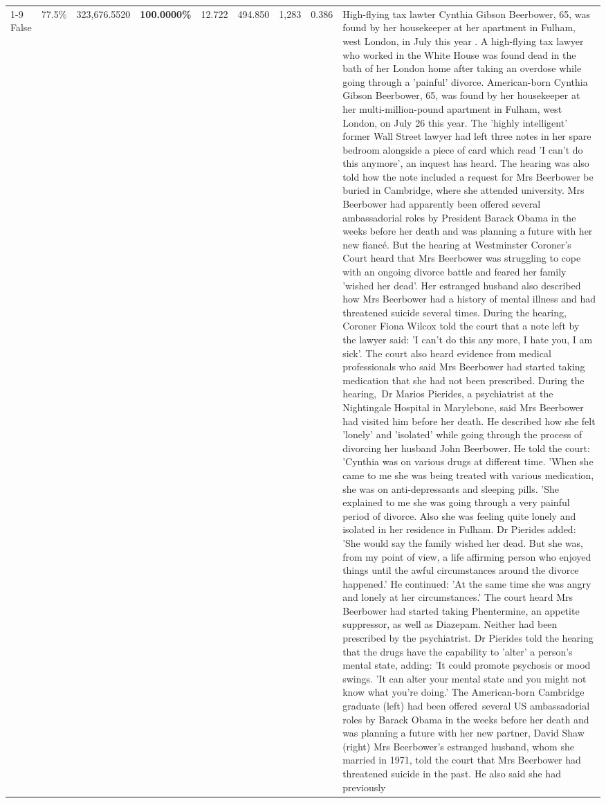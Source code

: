 \begin{table}[H]
\begin{tabular}{lllrlllll}
\cline{1-9}
False & 77.5\% & 323,676.5520 & \bfseries \color{red} 100.0000\% & 12.722 & 494.850 & 1,283 & 0.386 & High-flying tax lawter Cynthia Gibson Beerbower, 65, was found by her housekeeper at her apartment in Fulham, west London, in July this year . A high-flying tax lawyer who worked in the White House was found dead in the bath of her London home after taking an overdose while going through a 'painful' divorce. American-born Cynthia Gibson Beerbower, 65, was found by her housekeeper at her multi-million-pound apartment in Fulham, west London, on July 26 this year. The 'highly intelligent' former Wall Street lawyer had left three notes in her spare bedroom alongside a piece of card which read 'I can't do this anymore', an inquest has heard. The hearing was also told how the note included a request for Mrs Beerbower be buried in Cambridge, where she attended university. Mrs Beerbower had apparently been offered several ambassadorial roles by President Barack Obama in the weeks before her death and was planning a future with her new fiancé. But the hearing at Westminster Coroner's Court heard that Mrs Beerbower was struggling to cope with an ongoing divorce battle and feared her family 'wished her dead'. Her estranged husband also described how Mrs Beerbower had a history of mental illness and had threatened suicide several times. During the hearing, Coroner Fiona Wilcox told the court that a note left by the lawyer said: 'I can't do this any more, I hate you, I am sick'. The court also heard evidence from medical professionals who said Mrs Beerbower had started taking medication that she had not been prescribed. During the hearing, Dr Marios Pierides, a psychiatrist at the Nightingale Hospital in Marylebone, said Mrs Beerbower had visited him before her death. He described how she felt 'lonely' and 'isolated' while going through the process of divorcing her husband John Beerbower. He told the court: 'Cynthia was on various drugs at different time. 'When she came to me she was being treated with various medication, she was on anti-depressants and sleeping pills. 'She explained to me she was going through a very painful period of divorce. Also she was feeling quite lonely and isolated in her residence in Fulham. Dr Pierides added: 'She would say the family wished her dead. But she was, from my point of view, a life affirming person who enjoyed things until the awful circumstances around the divorce happened.' He continued: 'At the same time she was angry and lonely at her circumstances.' The court heard Mrs Beerbower had started taking Phentermine, an appetite suppressor, as well as Diazepam. Neither had been prescribed by the psychiatrist. Dr Pierides told the hearing that the drugs have the capability to 'alter' a person's mental state, adding: 'It could promote psychosis or mood swings. 'It can alter your mental state and you might not know what you're doing.' The American-born Cambridge graduate (left) had been offered several US ambassadorial roles by Barack Obama in the weeks before her death and was planning a future with her new partner, David Shaw (right) Mrs Beerbower's estranged husband, whom she married in 1971, told the court that Mrs Beerbower had threatened suicide in the past. He also said she had previously 
\end{tabular}
\end{table}
